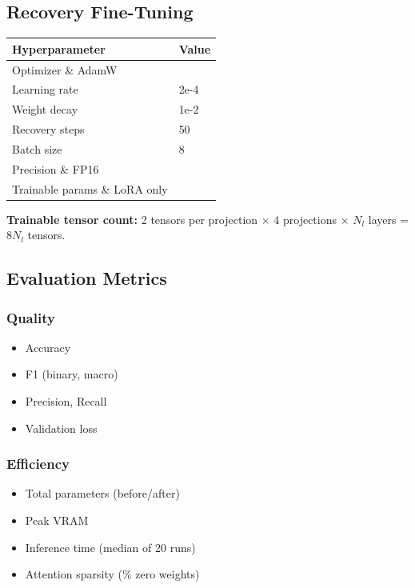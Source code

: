 \subsection{Recovery Fine-Tuning}

\begin{table}[H]
\centering
\small
\begin{tabular}{ll}
\toprule
\textbf{Hyperparameter} & \textbf{Value} \\
\midrule
Optimizer \& AdamW \\
Learning rate & 2e-4 \\
Weight decay & 1e-2 \\
Recovery steps & 50 \\
Batch size & 8 \\
Precision \& FP16 \\
Trainable params \& LoRA only \\
\bottomrule
\end{tabular}
\end{table}

\textbf{Trainable tensor count:} 2 tensors per projection $\times$ 4 projections $\times$ $N_l$ 
layers = 8$N_l$ tensors.

\subsection{Evaluation Metrics}

\subsubsection{Quality}
\begin{itemize}
\item Accuracy
\item F1 (binary, macro)
\item Precision, Recall
\item Validation loss

\end{itemize}
\subsubsection{Efficiency}
\begin{itemize}
\item Total parameters (before/after)
\item Peak VRAM
\item Inference time (median of 20 runs)
\item Attention sparsity (\% zero weights)

\end{itemize}
